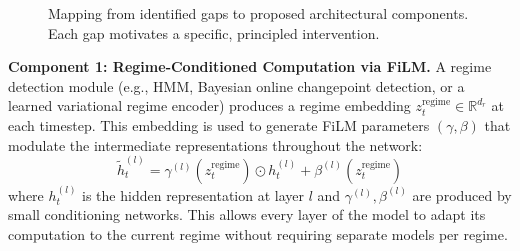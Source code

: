\documentclass[conference]{IEEEtran}
\begin{document}
\begin{figure}[ht]
\centering
{}
\caption{Mapping from identified gaps to proposed architectural components. Each gap motivates a specific, principled intervention.}
\label{fig:gap_map}
\end{figure}

\textbf{Component 1: Regime-Conditioned Computation via FiLM.} A regime detection module (e.g., HMM, Bayesian online changepoint detection, or a learned variational regime encoder) produces a regime embedding $z_t^{\text{regime}} \in \mathbb{R}^{d_r}$ at each timestep. This embedding is used to generate FiLM parameters $(\gamma, \beta)$ that modulate the intermediate representations throughout the network:
\begin{equation}
\tilde{h}_t^{(l)} = \gamma^{(l)}(z_t^{\text{regime}}) \odot h_t^{(l)} + \beta^{(l)}(z_t^{\text{regime}})
\end{equation}
where $h_t^{(l)}$ is the hidden representation at layer $l$ and $\gamma^{(l)}, \beta^{(l)}$ are produced by small conditioning networks. This allows every layer of the model to adapt its computation to the current regime without requiring separate models per regime.
\end{document}
